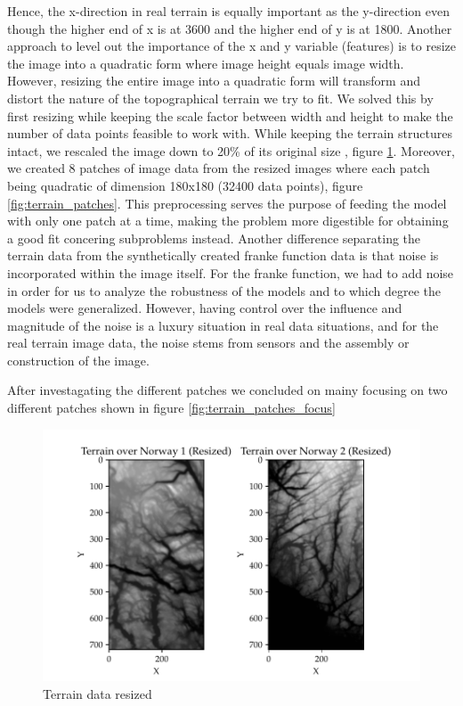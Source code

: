 \documentclass[11pt, a4paper]{article}
\begin{document}
Hence, the x-direction in real terrain is equally important as the y-direction even though the higher end of x is at 3600 and the higher end of y is at 1800. Another approach to level out the importance of the x and y variable (features) is to resize the image into a quadratic form where image height equals image width. 
However, resizing the entire image into a quadratic form will transform and distort the nature of the topographical terrain we try to fit. We solved this by first resizing while keeping the scale factor between width and height to make the number of data points feasible to work with. While keeping the terrain structures intact, we rescaled the image down to 20\% of its original size , figure \ref{fig:terrain_resized}.
Moreover, we created 8 patches of image data from the resized images where each patch being quadratic of dimension 180x180 (32400 data points), figure \ref{fig:terrain_patches}. This preprocessing serves the purpose of feeding the model with only one patch at a time, making the problem more digestible for obtaining a good fit concering subproblems instead. 
Another difference separating the terrain data from the synthetically created franke function data is that noise is incorporated within the image itself. For the franke function, we had to add noise in order for us to analyze the robustness of the models and to which degree the models were generalized. 
However, having control over the influence and magnitude of the noise is a luxury situation in real data situations, and for the real terrain image data, the noise stems from sensors and the assembly or construction of the image. 

After investagating the different patches we concluded on mainy focusing on two different patches shown in figure \ref{fig:terrain_patches_focus} 

\begin{figure}
  \centering
  \includegraphics[scale=0.75]{figures/EX6_terrain_data_resized.pdf}
  \caption{Terrain data resized}
  \label{fig:terrain_resized}
\end{figure}
\end{document}
